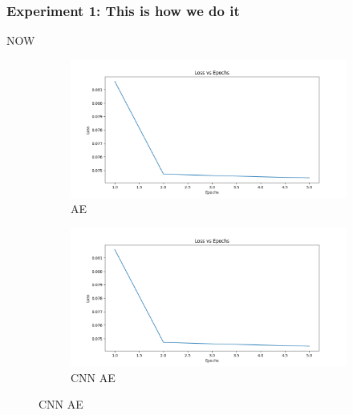 \subsubsection{Experiment 1: This is how we do it}

NOW

\begin{figure}
  \begin{subfigure}[t]{.5\textwidth}
    \centering
    \includegraphics[width=\linewidth]{figures/loss.png}
    \caption{AE}
  \end{subfigure}
  \hfill
  \begin{subfigure}[t]{.5\textwidth}
    \centering
    \includegraphics[width=\linewidth]{figures/loss.png}
    \caption{CNN AE}
  \end{subfigure}

  \medskip


\end{figure}
